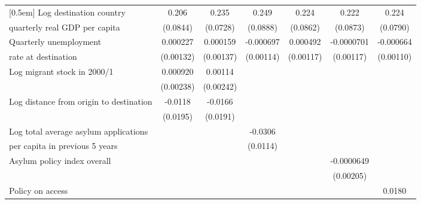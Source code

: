 \begin{table}[!ht]
\begin{tabular}{l*{6}{c}}
[0.5em]
Log destination country &       0.206\sym{*}  &       0.235\sym{**} &       0.249\sym{**} &       0.224\sym{*}  &       0.222\sym{*}  &       0.224\sym{**} \\
quarterly real GDP per capita                    &    (0.0844)         &    (0.0728)         &    (0.0888)         &    (0.0862)         &    (0.0873)         &    (0.0790)         \\
[0.5em]
Quarterly unemployment &    0.000227         &    0.000159         &   -0.000697         &    0.000492         &  -0.0000701         &   -0.000664         \\
rate at destination                    &   (0.00132)         &   (0.00137)         &   (0.00114)         &   (0.00117)         &   (0.00117)         &   (0.00110)         \\
[0.5em]
Log migrant stock in 2000/1&    0.000920         &     0.00114         &                     &                     &                     &                     \\
                    &   (0.00238)         &   (0.00242)         &                     &                     &                     &                     \\
[0.5em]
Log distance from origin to destination&     -0.0118         &     -0.0166         &                     &                     &                     &                     \\
                    &    (0.0195)         &    (0.0191)         &                     &                     &                     &                     \\
[0.5em]
Log total average asylum applications &                     &                     &     -0.0306\sym{**} &                     &                     &                     \\
per capita in previous 5 years                    &                     &                     &    (0.0114)         &                     &                     &                     \\
[0.5em]
Asylum policy index overall&                     &                     &                     &                     &  -0.0000649         &                     \\
                    &                     &                     &                     &                     &   (0.00205)         &                     \\
[0.5em]
Policy on access    &                     &                     &                     &                     &                     &      0.0180\sym{**} \\

\end{tabular}
\end{table}
